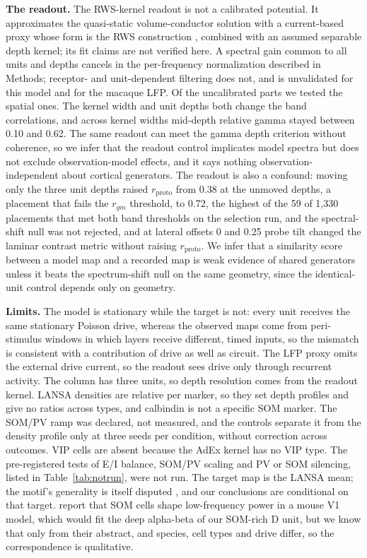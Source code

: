 \textbf{The readout.} The RWS-kernel readout is not a calibrated potential. It approximates the quasi-static
volume-conductor solution with a current-based proxy whose form is the RWS construction \citep{Mazzoni2015}, combined with an assumed separable depth kernel; its fit claims are not verified here. A spectral gain common
to all units and depths cancels in the per-frequency normalization described in Methods; receptor- and unit-dependent
filtering does not, and is unvalidated for this model and for the macaque LFP. Of the uncalibrated parts we tested
the spatial ones. The kernel width and unit depths both change the band correlations, and across kernel widths mid-depth relative gamma stayed between 0.10 and 0.62. The same readout can meet the gamma depth criterion without coherence, so we infer that the readout control
implicates model spectra but does not exclude observation-model effects, and it says nothing
observation-independent about cortical generators. The readout is
also a confound: moving only the three unit depths raised $r_\text{proto}$ from 0.38 at the unmoved depths, a placement that fails the $r_{gm}$ threshold, to 0.72, the highest of the 59 of 1,330 placements that met both band thresholds on the selection run, and the spectral-shift null was not
rejected, and at lateral offsets 0 and 0.25 probe tilt changed the laminar contrast metric without raising $r_\text{proto}$. We infer that a similarity score
between a model map and a recorded map is weak evidence of shared generators unless it beats the spectrum-shift null on the same geometry, since the identical-unit control depends only on geometry.

\textbf{Limits.} The model is stationary while the target is not: every unit receives the same stationary Poisson
drive, whereas the observed maps come from peri-stimulus windows in which layers receive different, timed
inputs, so the mismatch is consistent with a contribution of drive as well as circuit. The LFP proxy omits the external drive current, so the readout sees drive only through recurrent activity. The column has three units, so depth
resolution comes from the readout kernel. LANSA densities are relative per marker, so they set
depth profiles and give no ratios across types, and calbindin is not a specific SOM marker. The SOM/PV ramp was declared,
not measured, and the controls separate it from the density profile only at three seeds per condition, without
correction across outcomes. VIP cells are absent because the AdEx kernel has no VIP type. The pre-registered tests
of E/I balance, SOM/PV scaling and PV or SOM silencing, listed in Table~\ref{tab:notrun}, were not run. The target map is the
LANSA mean; the motif's generality is itself disputed \citep{Mackey2026}, and our conclusions are conditional on
that target. \citet{Herrera2026} report that SOM cells shape low-frequency power in a mouse V1 model, which would
fit the deep alpha-beta of our SOM-rich D unit, but we know that only from their abstract, and species, cell types
and drive differ, so the correspondence is
qualitative.
